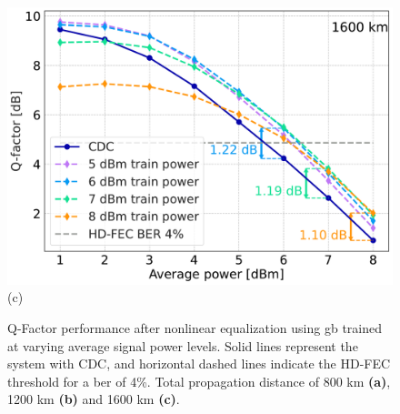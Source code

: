 \begin{figure}[ht]
{\begin{minipage}[h]{0.49\linewidth}
{            \includegraphics[width=1\linewidth]{images/boost/q_different_models_single_1600.pdf} (c) \\
        }
        \end{minipage}
    }
    \caption{Q-Factor performance after nonlinear equalization using \acrshort{gb} trained at varying average signal power levels. Solid lines represent the system with CDC, and horizontal dashed lines indicate the HD-FEC threshold for a \acrshort{ber} of 4\%. Total propagation distance of 800 km \textbf{(a)}, 1200 km \textbf{(b)} and 1600 km \textbf{(c)}.}
    \label{fig:boost_result}
\end{figure}





